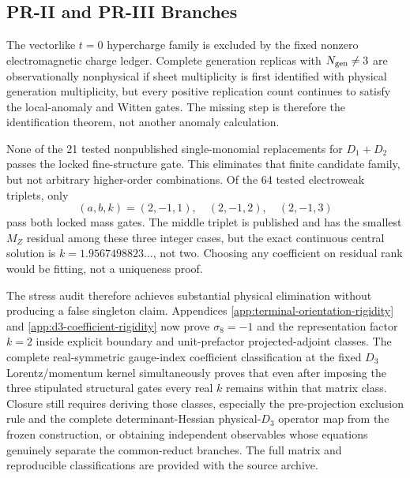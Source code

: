 \subsection{PR-II and PR-III Branches}

The vectorlike $t=0$ hypercharge family is excluded by the fixed nonzero electromagnetic charge ledger.  Complete generation replicas with $N_{\rm gen}\ne3$ are observationally nonphysical if sheet multiplicity is first identified with physical generation multiplicity, but every positive replication count continues to satisfy the local-anomaly and Witten gates. The missing step is therefore the identification theorem, not another anomaly calculation.

None of the 21 tested nonpublished single-monomial replacements for $D_1+D_2$ passes the locked fine-structure gate.  This eliminates that finite candidate family, but not arbitrary higher-order combinations.  Of the 64 tested electroweak triplets, only
\begin{equation}
 (a,b,k)=(2,-1,1),\quad(2,-1,2),\quad(2,-1,3)
\end{equation}
pass both locked mass gates.  The middle triplet is published and has the smallest $M_Z$ residual among these three integer cases, but the exact continuous central solution is $k=1.9567498823\ldots$, not two.  Choosing any coefficient on residual rank would be fitting, not a uniqueness proof.

The stress audit therefore achieves substantial physical elimination without producing a false singleton claim.  Appendices \ref{app:terminal-orientation-rigidity} and \ref{app:d3-coefficient-rigidity} now prove $\sigma_8=-1$ and the representation factor $k=2$ inside explicit boundary and unit-prefactor projected-adjoint classes.  The complete real-symmetric gauge-index coefficient classification at the fixed $D_3$ Lorentz/momentum kernel simultaneously proves that even after imposing the three stipulated structural gates every real $k$ remains within that matrix class.  Closure still requires deriving those classes, especially the pre-projection exclusion rule and the complete determinant-Hessian physical-$D_3$ operator map from the frozen construction, or obtaining independent observables whose equations genuinely separate the common-reduct branches.  The full matrix and reproducible classifications are provided with the source archive.
